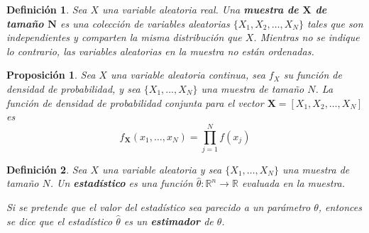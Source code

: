 \documentclass[12pt,letterpaper,draft]{book}
\newtheorem{definicion}{Definición}[chapter]
\newtheorem{proposicion}[teorema]{Proposición}
\newcommand{\R}{\mathbb{R}}
\begin{document}
\begin{definicion}
Sea $X$ una variable aleatoria real. Una \textbf{muestra de $\boldsymbol{X}$ de tamaño $\boldsymbol{N}$} es una colección de variables aleatorias $\{ X_1, X_2, \dots, X_N \}$ tales que son independientes y comparten la misma distribución que $X$.
%
Mientras no se indique lo contrario, las variables aleatorias en la muestra no están ordenadas.
\end{definicion}

\begin{proposicion}
Sea $X$ una variable aleatoria continua, sea $f_X$ su función de densidad de probabilidad, y sea $\{ X_1, \dots, X_N \}$ una muestra de tamaño $N$. 
%
La función de densidad de probabilidad conjunta para el vector $\boldsymbol{X}=[ X_1, X_2, \dots, X_N ]$ es
\begin{equation}
f_{\boldsymbol{X}}(x_1, \dots, x_N ) = \prod_{j=1}^{N} f(x_j)
\end{equation}
\label{oculto1}
\end{proposicion}

\begin{definicion}
Sea $X$ una variable aleatoria y sea $\{ X_1, \dots, X_N \}$ una muestra de tamaño $N$.
%
Un \textbf{estadístico} es una función $\widehat{\theta}: \R^{n}\rightarrow\R$ evaluada en la muestra.

Si se pretende que el valor del estadístico sea \textit{parecido} a un parámetro $\theta$, entonces se dice que el estadístico $\widehat{\theta}$ es un \textbf{estimador} de $\theta$.
\end{definicion}


\end{document}
